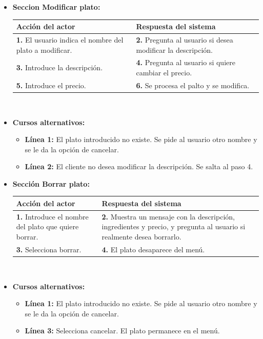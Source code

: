 \documentclass[spanish,a4paper,11pt, twoside]{report}	%
\begin{document}
\begin{itemize}
			\item \textbf{Seccion Modificar plato:} 	\\
				\begin{tabular}{|p{6cm}||p{6cm}|}
				\hline
				\textbf{Acción del actor} & \textbf{Respuesta del sistema} \\ \hline \hline
				\textbf{1.} El usuario indica el nombre del plato a modificar. & 
				\textbf{2.} Pregunta al usuario si desea modificar la descripción. \\ \hline
				\textbf{3.} Introduce la descripción.	& 
				\textbf{4.} Pregunta al usuario si quiere cambiar el precio. \\ \hline
				\textbf{5.} Introduce el precio. & 
				\textbf{6.} Se procesa el palto y se modifica. \\ \hline
			\end{tabular}
			\\
			\item \textbf{Cursos alternativos:} 
			\begin{itemize}
				\item  \textbf{Línea 1:} El plato introducido no existe. Se pide al usuario otro
				nombre y se le da la opción de cancelar.
				\item  \textbf{Línea 2:} El cliente no desea modificar la descripción. Se salta
				al paso 4.

			\end {itemize}
			
			\item \textbf{Sección Borrar plato:} 	\\
				\begin{tabular}{|p{6cm}||p{6cm}|}
				\hline
				\textbf{Acción del actor} & \textbf{Respuesta del sistema} \\ \hline \hline
				\textbf{1.} Introduce el nombre del plato que quiere borrar. & 
				\textbf{2.} Muestra un mensaje con la descripción, ingredientes y precio, 
					y pregunta al usuario si realmente desea borrarlo.\\ \hline 
				\textbf{3.} Selecciona borrar. & 
				\textbf{4.} El plato desaparece del menú. \\ \hline
			\end{tabular}
			\\
			\item \textbf{Cursos alternativos:} 
			\begin{itemize}
				\item  \textbf{Línea 1:} El plato introducido no existe. Se pide al usuario otro nombre y 
					se le da la opción de cancelar.
				\item  \textbf{Línea 3:} Selecciona cancelar. El plato permanece en el menú.
			\end {itemize}
		\end {itemize}
\end{document}
